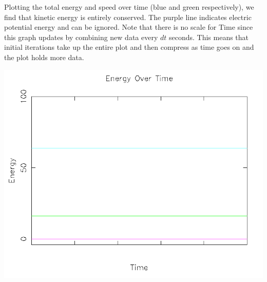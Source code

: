 \documentclass{article}
\begin{document}
Plotting the total energy and speed over time (blue and green respectively),
we find that kinetic energy is entirely conserved.
The purple line indicates electric potential energy and can be ignored.
Note that there is no scale for Time since this graph updates by combining new data every $dt$ seconds.
This means that initial iterations take up the entire plot and then compress as time goes on
and the plot holds more data.
\\
\begin{center}
    \includegraphics[scale=0.5]{uncharged_2_particles_1D_energy}
\end{center}
\end{document}
